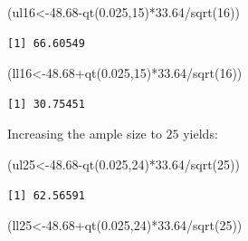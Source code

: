 \documentclass[
  letterpaper,
  DIV=11,
  numbers=noendperiod]{scrreprt}
\newenvironment{Shaded}{\begin{snugshade}}{\end{snugshade}}
\newcommand{\DecValTok}[1]{\textcolor[rgb]{0.68,0.00,0.00}{#1}}
\newcommand{\FloatTok}[1]{\textcolor[rgb]{0.68,0.00,0.00}{#1}}
\newcommand{\FunctionTok}[1]{\textcolor[rgb]{0.28,0.35,0.67}{#1}}
\newcommand{\NormalTok}[1]{\textcolor[rgb]{0.00,0.23,0.31}{#1}}
\newcommand{\OtherTok}[1]{\textcolor[rgb]{0.00,0.23,0.31}{#1}}
\newcommand{\SpecialCharTok}[1]{\textcolor[rgb]{0.37,0.37,0.37}{#1}}
\begin{document}
\begin{Shaded}
\begin{Highlighting}[numbers=left,,]
\NormalTok{(ul16}\OtherTok{\textless{}{-}}\FloatTok{48.68}\SpecialCharTok{{-}}\FunctionTok{qt}\NormalTok{(}\FloatTok{0.025}\NormalTok{,}\DecValTok{15}\NormalTok{)}\SpecialCharTok{*}\FloatTok{33.64}\SpecialCharTok{/}\FunctionTok{sqrt}\NormalTok{(}\DecValTok{16}\NormalTok{))}
\end{Highlighting}
\end{Shaded}

\begin{verbatim}
[1] 66.60549
\end{verbatim}

\begin{Shaded}
\begin{Highlighting}[numbers=left,,]
\NormalTok{(ll16}\OtherTok{\textless{}{-}}\FloatTok{48.68}\SpecialCharTok{+}\FunctionTok{qt}\NormalTok{(}\FloatTok{0.025}\NormalTok{,}\DecValTok{15}\NormalTok{)}\SpecialCharTok{*}\FloatTok{33.64}\SpecialCharTok{/}\FunctionTok{sqrt}\NormalTok{(}\DecValTok{16}\NormalTok{))}
\end{Highlighting}
\end{Shaded}

\begin{verbatim}
[1] 30.75451
\end{verbatim}

Increasing the ample size to \(25\) yields:

\begin{Shaded}
\begin{Highlighting}[numbers=left,,]
\NormalTok{(ul25}\OtherTok{\textless{}{-}}\FloatTok{48.68}\SpecialCharTok{{-}}\FunctionTok{qt}\NormalTok{(}\FloatTok{0.025}\NormalTok{,}\DecValTok{24}\NormalTok{)}\SpecialCharTok{*}\FloatTok{33.64}\SpecialCharTok{/}\FunctionTok{sqrt}\NormalTok{(}\DecValTok{25}\NormalTok{))}
\end{Highlighting}
\end{Shaded}

\begin{verbatim}
[1] 62.56591
\end{verbatim}

\begin{Shaded}
\begin{Highlighting}[numbers=left,,]
\NormalTok{(ll25}\OtherTok{\textless{}{-}}\FloatTok{48.68}\SpecialCharTok{+}\FunctionTok{qt}\NormalTok{(}\FloatTok{0.025}\NormalTok{,}\DecValTok{24}\NormalTok{)}\SpecialCharTok{*}\FloatTok{33.64}\SpecialCharTok{/}\FunctionTok{sqrt}\NormalTok{(}\DecValTok{25}\NormalTok{))}
\end{Highlighting}
\end{Shaded}
\end{document}
